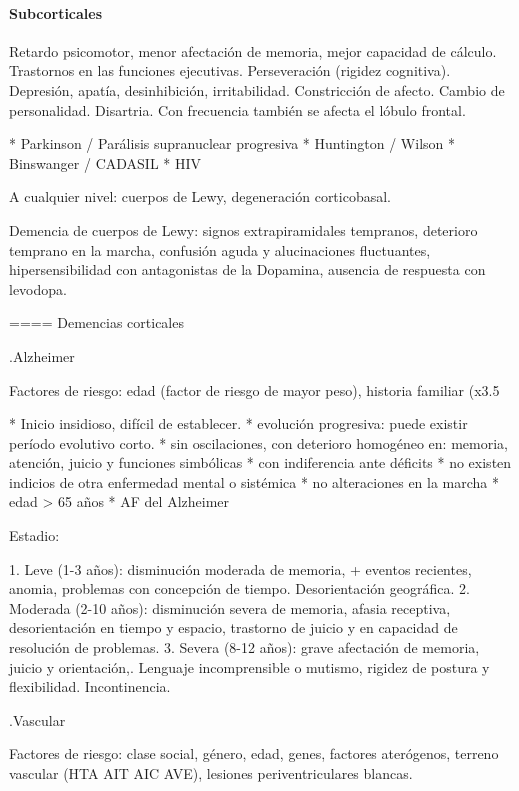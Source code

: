 \documentclass[encares.tex]{subfiles}
\begin{document}
\paragraph{Subcorticales}
Retardo psicomotor, menor afectación de memoria, mejor capacidad de cálculo. Trastornos en las funciones ejecutivas. Perseveración (rigidez cognitiva). Depresión, apatía, desinhibición, irritabilidad. Constricción de afecto. Cambio de personalidad. Disartria. Con frecuencia también se afecta el lóbulo frontal.

* Parkinson / Parálisis supranuclear progresiva
* Huntington / Wilson
* Binswanger / CADASIL
* HIV

A cualquier nivel: cuerpos de Lewy, degeneración corticobasal.

Demencia de cuerpos de Lewy: signos extrapiramidales tempranos, deterioro temprano en la marcha, confusión aguda y alucinaciones fluctuantes, hipersensibilidad con antagonistas de la Dopamina, ausencia de respuesta con levodopa.

==== Demencias corticales

.Alzheimer

Factores de riesgo: edad (factor de riesgo de mayor peso), historia familiar (x3.5%

* Inicio insidioso, difícil de establecer.
* evolución progresiva: puede existir período evolutivo corto.
* sin oscilaciones, con deterioro homogéneo en: memoria, atención, juicio y funciones simbólicas
* con indiferencia ante déficits
* no existen indicios de otra enfermedad mental o sistémica
* no alteraciones en la marcha
* edad > 65 años
* AF del Alzheimer

Estadio:

1. Leve (1-3 años): disminución moderada de memoria, + eventos recientes, anomia, problemas con concepción de tiempo. Desorientación geográfica.
2. Moderada (2-10 años): disminución severa de memoria, afasia receptiva, desorientación en tiempo y espacio, trastorno de juicio y en capacidad de resolución de problemas.
3. Severa (8-12 años): grave afectación de memoria, juicio y orientación,. Lenguaje incomprensible o mutismo, rigidez de postura y flexibilidad. Incontinencia.

.Vascular

Factores de riesgo: clase social, género, edad, genes, factores aterógenos, terreno vascular (HTA AIT AIC AVE), lesiones periventriculares blancas.
\end{document}
